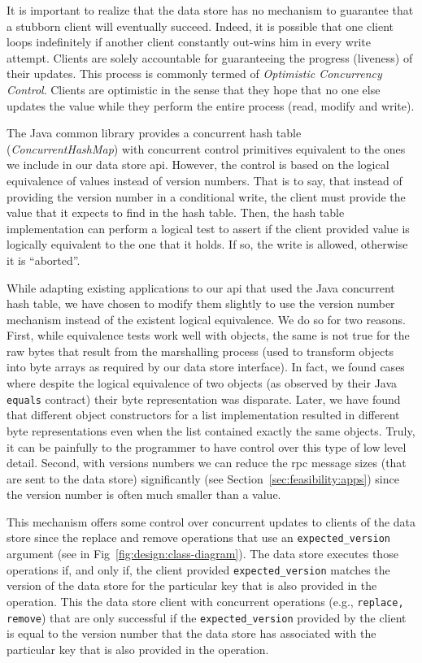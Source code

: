 It is important to realize that the data store has no mechanism to guarantee that a stubborn client will eventually succeed.
Indeed, it is possible that one client  loops indefinitely if another client constantly out-wins him in every write attempt. 
Clients are solely accountable for  guaranteeing  the progress (liveness) of their updates. 
This process is commonly termed of \emph{Optimistic Concurrency Control}. Clients are optimistic in the sense that they hope that no one else updates the value while they perform the entire process (read, modify and write). 

The Java common library provides a concurrent hash table (\emph{ConcurrentHashMap}) with concurrent control primitives  equivalent to the ones we include in our data store \gls{api}. 
However, the control is based on the logical equivalence of values instead of version numbers. 
That is to say, that instead of providing the version number in a conditional write, the client must provide the value that it expects to find in the hash table. 
Then, the hash table implementation can perform a logical test to assert if the client provided value is logically equivalent to the one that it holds. If so, the write is allowed, otherwise it is ``aborted''.  

While adapting existing applications to our \gls{api} that used the Java concurrent hash table, we have chosen to modify them slightly to use the version number mechanism instead of the existent logical equivalence. We do so for two reasons. First, while equivalence tests work well with objects, the same is not true for the raw bytes that result from the marshalling process (used to transform objects into byte arrays as required by our data store interface). In fact, we found cases where despite the  logical equivalence of two objects (as observed by their Java \texttt{equals} contract) their byte representation was disparate. Later, we have found that different object constructors for a list implementation resulted in different byte representations even when the list contained exactly the same objects. Truly, it can be painfully to the programmer to have control over this type of low level detail. Second, with versions numbers we can  reduce the \gls{rpc} message sizes (that are sent to the data store) significantly (see Section~\ref{sec:feasibility:apps}) since the version number is often much smaller than a value. 

This mechanism offers some control over concurrent updates to clients of the data store since the replace and remove operations that use an \texttt{expected\_version} argument (see in Fig~\ref{fig:design:class-diagram}). The data store executes those operations if, and only if, the client provided \texttt{expected\_version} matches the version of the data store for the particular key that is also provided in the operation.  
This the data store client with concurrent operations (e.g., \texttt{replace, remove}) that are only successful if the \texttt{expected\_version} provided by the client is equal to the version number that the data store has associated with the particular key that is also provided in the operation. 

